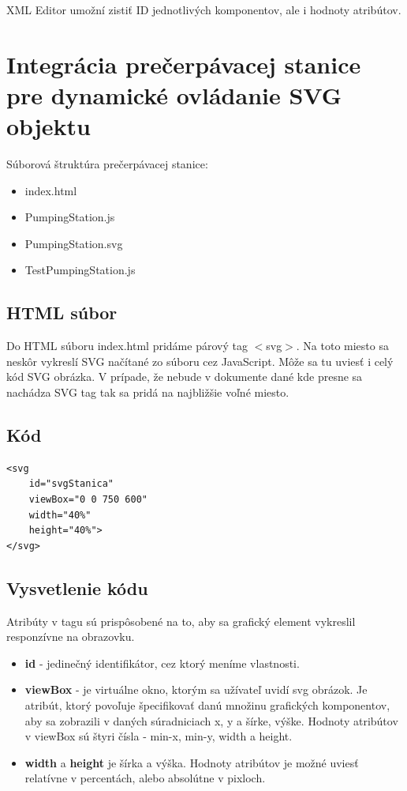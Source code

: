 XML Editor umožní zistiť ID jednotlivých komponentov, ale i hodnoty atribútov. 


\section{Integrácia prečerpávacej stanice pre dynamické ovládanie SVG objektu}

Súborová štruktúra prečerpávacej stanice: 
\begin{itemize}
	\item index.html 
	\item PumpingStation.js
	\item PumpingStation.svg
	\item TestPumpingStation.js
\end{itemize}

\subsection{HTML súbor}
Do HTML súboru index.html pridáme párový tag $<$svg$>$.  Na toto miesto sa neskôr vykreslí SVG načítané zo súboru cez JavaScript. Môže sa tu uviesť i celý kód SVG obrázka. V prípade, že nebude v dokumente dané kde presne sa nachádza SVG tag tak sa pridá na najbližšie voľné miesto. 
\subsection{Kód}
\begin{lstlisting}
<svg 
	id="svgStanica" 
	viewBox="0 0 750 600" 
	width="40%" 
	height="40%"> 
</svg>
\end{lstlisting}

\subsection{Vysvetlenie kódu}
Atribúty v tagu sú prispôsobené na to, aby sa grafický element vykreslil responzívne na obrazovku.
\begin{itemize}
\item  \textbf{id} - jedinečný identifikátor, cez ktorý meníme vlastnosti.
\item 	\textbf{viewBox} - je virtuálne okno, ktorým sa užívateľ uvidí svg obrázok. Je atribút, ktorý povoľuje špecifikovať danú množinu grafických komponentov, aby sa zobrazili v daných súradniciach x, y a šírke, výške. Hodnoty atribútov v viewBox sú štyri čísla - min-x, min-y, width a height. 
\item 	\textbf{width} a \textbf{height} je šírka a výška. Hodnoty atribútov je možné uviesť relatívne v percentách, alebo absolútne v pixloch. 
\end{itemize}

